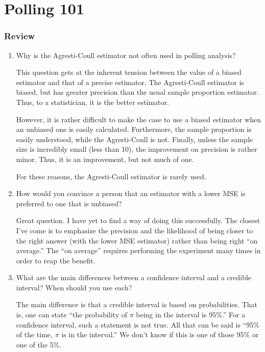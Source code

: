 \chapter{Polling 101}
\label{ch:polling101}

\subsection*{Review}
\begin{enumerate}

  \item Why is the Agresti-Coull estimator not often used in polling analysis?
\begin{solution}
This question gets at the inherent tension between the value of a biased estimator and that of a precise estimator. The Agresti-Coull estimator is biased, but has greater precision than the usual sample proportion estimator. Thus, to a statistician, it is the better estimator.

However, it is rather difficult to make the case to use a biased estimator when an unbiased one is easily calculated. Furthermore, the sample proportion is easily understood, while the Agresti-Coull is not. Finally, unless the sample size is incredibly small (less than 10), the improvement on precision is rather minor. Thus, it is an improvement, but not much of one.

For these reasons, the Agresti-Coull estimator is rarely used.
\end{solution}
%


  \item How would you convince a person that an estimator with a lower MSE is preferred to one that is unbiased?
\begin{solution}
Great question. I have yet to find a way of doing this successfully. The closest I've come is to emphasize the precision and the likelihood of being closer to the right answer (with the lower MSE estimator) rather than being right ``on average.'' The ``on average'' requires performing the experiment many times in order to reap the benefit.
\end{solution}
%


  \item What are the main differences between a confidence interval and a credible interval? When should you use each?
\begin{solution}
The main difference is that a credible interval is based on probabilities. That is, one can state ``the probability of $\pi$ being in the interval is 95\%.'' For a confidence interval, such a statement is not true. All that can be said is ``95\% of the time, $\pi$ is in the interval.'' We don't know if this is one of those 95\% or one of the 5\%.


\end{solution}
\end{enumerate}
